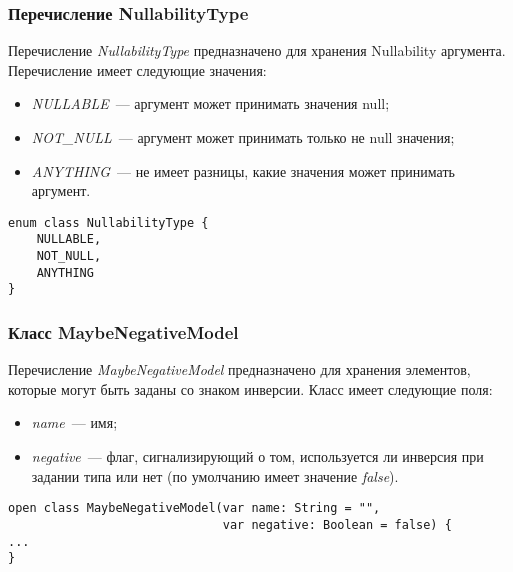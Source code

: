 \subsubsection{Перечисление NullabilityType}
\label{ssub:NullabilityType}
Перечисление \textit{NullabilityType} предназначено для хранения Nullability 
аргумента.
Перечисление имеет следующие значения:
\begin{itemize}
	\item \textit{NULLABLE}~--- аргумент может принимать значения null;
	\item \textit{NOT\_NULL}~--- аргумент может принимать только не null
		  значения;
	\item \textit{ANYTHING}~--- не имеет разницы, какие значения может
		  принимать аргумент.
\end{itemize}

\begin{lstlisting}[style={java}, label={lst:NullabilityType},
  caption={Перечисление NullabilityType}]
enum class NullabilityType {
    NULLABLE,
    NOT_NULL,
    ANYTHING
}
\end{lstlisting}
\subsubsection{Класс MaybeNegativeModel}
\label{ssub:MaybeNegativeModel}
Перечисление \textit{MaybeNegativeModel} предназначено для хранения элементов, которые могут быть заданы со знаком инверсии.
Класс имеет следующие поля:
\begin{itemize}
	\item \textit{name}~--- имя;
	\item \textit{negative}~--- флаг, сигнализирующий о том, используется ли
		  инверсия при задании типа или нет (по умолчанию имеет значение
		  \textit{false}).
\end{itemize}

\begin{lstlisting}[style={java}, label={lst:MaybeNegativeModel},
  caption={Класс MaybeNegativeModel}]
open class MaybeNegativeModel(var name: String = "",
                              var negative: Boolean = false) {
...
}
\end{lstlisting}
